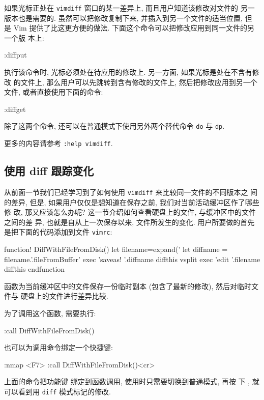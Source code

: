如果光标正处在 \texttt{vimdiff} 窗口的某一差异上, 而且用户知道该修改对文件的
另一版本也是需要的. 虽然可以把修改复制下来, 并插入到另一个文件的适当位置, 但
是 Vim 提供了比这更方便的做法. 下面这个命令可以把修改应用到同一文件的另一个版
本上:
\begin{vimcode}
:diffput
\end{vimcode}

执行该命令时, 光标必须处在待应用的修改上. 另一方面, 如果光标是处在不含有修改
的文件上, 那么用户可以先跳转到含有修改的文件上, 然后把修改应用到另一个文件,
或者直接使用下面的命令:
\begin{vimcode}
:diffget
\end{vimcode}
除了这两个命令, 还可以在普通模式下使用另外两个替代命令 \texttt{do} 与
\texttt{dp}.

\begin{warning}
    更多的内容请参考 \texttt{:help vimdiff}.
\end{warning}

\subsection{使用 diff 跟踪变化}
\label{subsec:using_diff_to_track_changes}

从前面一节我们已经学习到了如何使用 \texttt{vimdiff} 来比较同一文件的不同版本之
间的差异, 但是, 如果用户仅仅是想知道在保存之前, 我们对当前活动缓冲区作了哪些修
改, 那又应该怎么办呢? 这一节介绍如何查看硬盘上的文件, 与缓冲区中的文件之间的差
异, 也就是自从上一次保存以来, 文件所发生的变化.
用户所要做的首先是把下面的代码添加到文件 \texttt{vimrc}:
\begin{vimcode}
function! DiffWithFileFromDisk()
	  let filename=expand('%
	  let diffname = filename.'.fileFromBuffer'
	  exec 'saveas! '.diffname
	  diffthis
	  vsplit
	  exec 'edit '.filename
	  diffthis
	endfunction
\end{vimcode}

函数为当前缓冲区中的文件保存一份临时副本 (包含了最新的修改), 然后对临时文件与
硬盘上的文件进行差异比较.

为了调用这个函数, 需要执行:
\begin{vimcode}
:call DiffWithFileFromDisk()
\end{vimcode}
也可以为调用命令绑定一个快捷键:
\begin{vimcode}
:nmap <F7> :call DiffWithFileFromDisk()<cr>
\end{vimcode}
上面的命令把功能键  绑定到函数调用, 使用时只需要切换到普通模式, 再按
下 , 就可以看到用 \texttt{diff} 模式标记的修改.

